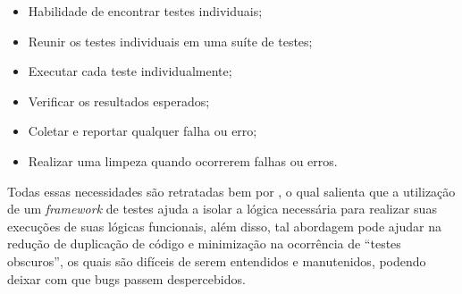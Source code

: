         \begin{itemize}

        \item Habilidade de encontrar testes individuais;
        \item Reunir os testes individuais em uma suíte de testes;
        \item Executar cada teste individualmente;
        \item Verificar os resultados esperados;
        \item Coletar e reportar qualquer falha ou erro;
        \item Realizar uma limpeza quando ocorrerem falhas ou erros.

        \end{itemize}

        Todas essas necessidades são retratadas bem por , o qual salienta que a utilização de um \textit{framework} de testes ajuda a isolar a lógica necessária para realizar suas execuções de suas lógicas funcionais, além disso, tal abordagem pode ajudar na redução de duplicação de código e minimização na ocorrência de “testes obscuros”, os quais são difíceis de serem entendidos e manutenidos, podendo deixar com que bugs passem despercebidos.
